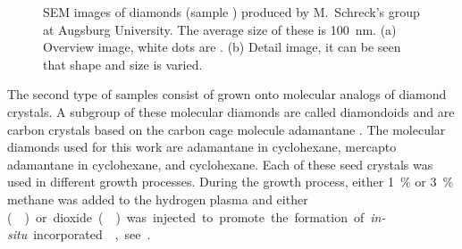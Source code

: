 	\begin{figure}[htp]
		\begin{subfigure}[t]{ 0.49\linewidth}
			\caption{}\label{subfig::cvd_large}
			\centering
		\end{subfigure}
		\hfill
		\begin{subfigure}[t]{ 0.49\linewidth}
			\caption{}\label{subfig::cvd_detail}
			\centering
		\end{subfigure}
		\caption[Example of \CVD \nds]{SEM images of \CVD diamonds (sample \insitucvd) produced by M.\ Schreck's group at Augsburg University. The average size of these \nds is \SI{100}{nm}. (a) Overview image, white dots are \nds. (b) Detail image, it can be seen that \nd shape and size is varied.}
		\label{fig::sem_cvd}
	\end{figure}

	The second type of samples consist of \CVD \nds grown onto molecular analogs of diamond crystals.
	A subgroup of these molecular diamonds are called diamondoids and are carbon crystals based on the carbon cage molecule adamantane .
	The molecular diamonds used for this work are adamantane in cyclohexane, mercapto adamantane in cyclohexane, and cyclohexane.
	Each of these seed crystals was used in different growth processes.
	During the growth process, either \SI{1}{\percent} or \SI{3}{\percent} methane was added to the hydrogen plasma and either \si () or \si dioxide () was injected to promote the formation of \textit{in-situ} incorporated \sivs, see .


